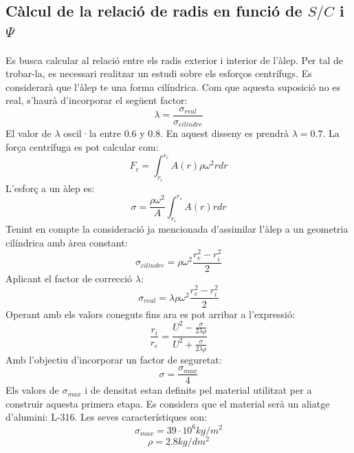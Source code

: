 \subsection{Càlcul de la relació de radis en funció de $S/C$ i $\Psi$}
Es busca calcular al relació entre els radis exterior i interior de l'àlep. Per tal de trobar-la, es necessari realitzar un estudi sobre els esforços centrífugs. Es considerarà que l'àlep te una forma cilíndrica. Com que aquesta suposició no es real, s'haurà d'incorporar el següent factor:
\begin{equation}
\lambda=\frac{\sigma_{real}}{\sigma_{cilindre}}
\end{equation}
El valor de $\lambda$ oscil·la entre $0.6$ y $0.8$. En aquest disseny es prendrà $\lambda=0.7$.
La força centrífuga es pot calcular com: 
\begin{equation}
F_c=\int_{r_i}^{r_e} A(r)\rho\omega^2rdr
\end{equation}
L'esforç a un àlep es: 
\begin{equation}
\sigma=\frac{\rho\omega^2}{A}\int_{r_i}^{r_e} A(r)rdr
\end{equation}
Tenint en compte la consideració ja mencionada d'assimilar l'àlep a un geometria cilíndrica amb àrea constant: 
\begin{equation}
\sigma_{cilindre}=\rho\omega^2\frac{r_e^2-r_i^2}{2}
\end{equation}
Aplicant el factor de correcció $\lambda$:
\begin{equation}
\sigma_{real}=\lambda\rho\omega^2\frac{r_e^2-r_i^2}{2}
\end{equation}
Operant amb els valors coneguts fins ara es pot arribar a l'expressió: 
\begin{equation}
\frac{r_i}{r_e}=\frac{U^2-\frac{\sigma}{2\lambda\rho}}{U^2+\frac{\sigma}{2\lambda\rho}}
\label{rireeq}
\end{equation}
Amb l'objectiu d'incorporar un factor de seguretat: 
\begin{equation}
\sigma=\frac{\sigma_{max}}{4}
\end{equation}
Els valors de $\sigma_{max}$ i de densitat estan definits pel material utilitzat per a construir aquesta primera etapa. Es considera que el material serà un aliatge d'alumini: L-316. Les seves característiques son: 
\begin{equation}
\nonumber \sigma_{max}=39·10^6 kg/m^2
\end{equation}
\begin{equation}
\nonumber \rho=2.8 kg/dm^2
\end{equation}
